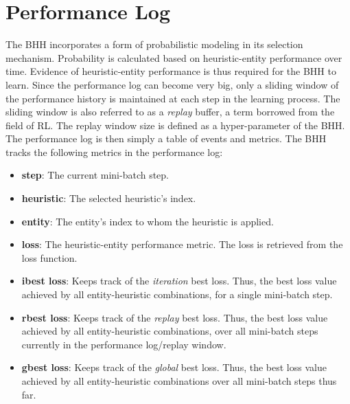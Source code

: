 \section{Performance Log}\label{sec:bhh:performance_log}

The \acs{BHH} incorporates a form of probabilistic modeling in its selection mechanism. Probability is calculated based on heuristic-entity performance over time. Evidence of heuristic-entity performance is thus required for the \acs{BHH} to learn. Since the performance log can become very big, only a sliding window of the performance history is maintained at each step in the learning process. The sliding window is also referred to as a \textit{replay} buffer, a term borrowed from the field of \acf{RL}. The replay window size is defined as a hyper-parameter of the \acs{BHH}. The performance log is then simply a table of events and metrics. The \acs{BHH} tracks the following metrics in the performance log:

\begin{itemize}
      \item \textbf{step}: The current mini-batch step.

      \item \textbf{heuristic}: The selected heuristic's index.

      \item \textbf{entity}: The entity's index to whom the heuristic is applied.

      \item \textbf{loss}: The heuristic-entity performance metric. The loss is retrieved from the loss function.

      \item \textbf{ibest loss}: Keeps track of the \textit{iteration} best loss. Thus, the best loss value achieved by all entity-heuristic combinations, for a single mini-batch step.

      \item \textbf{rbest loss}:  Keeps track of the \textit{replay} best loss. Thus, the best loss value achieved by all entity-heuristic combinations, over all mini-batch steps currently in the performance log/replay window.

      \item \textbf{gbest loss}:  Keeps track of the \textit{global} best loss. Thus, the best loss value achieved by all entity-heuristic combinations over all mini-batch steps thus far.
\end{itemize}

